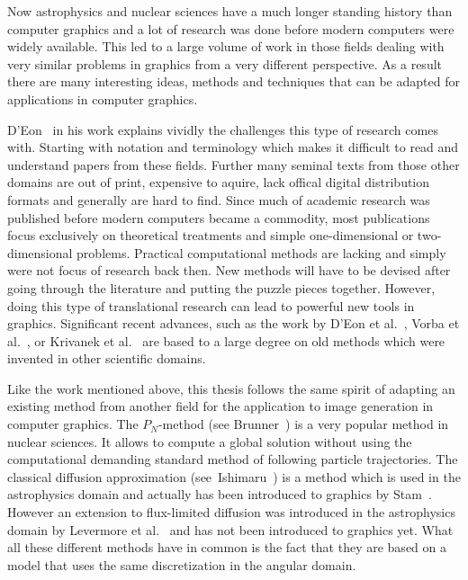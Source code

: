 Now astrophysics and nuclear sciences have a much longer standing history than computer graphics and a lot of research was done before modern computers were widely available. This led to a large volume of work in those fields dealing with very similar problems in graphics from a very different perspective. As a result there are many interesting ideas, methods and techniques that can be adapted for applications in computer graphics.

D'Eon~\cite{DEon14} in his work explains vividly the challenges this type of research comes with. Starting with notation and terminology which makes it difficult to read and understand papers from these fields. Further many seminal texts from those other domains are out of print, expensive to aquire, lack offical digital distribution formats and generally are hard to find. Since much of academic research was published before modern computers became a commodity, most publications focus exclusively on theoretical treatments and simple one-dimensional or two-dimensional problems. Practical computational methods are lacking and simply were not focus of research back then. New methods will have to be devised after going through the literature and putting the puzzle pieces together. However, doing this type of translational research can lead to powerful new tools in graphics. Significant recent advances, such as the work by D'Eon et al.~\cite{dEon11}, Vorba et al.~\cite{Vorba16}, or Krivanek et al.~\cite{Krivanek14} are based to a large degree on old methods which were invented in other scientific domains.

Like the work mentioned above, this thesis follows the same spirit of adapting an existing method from another field for the application to image generation in computer graphics. The $P_N$-method (see Brunner~\cite{Brunner02}) is a very popular method in nuclear sciences. It allows to compute a global solution without using the computational demanding standard method of following particle trajectories. The classical diffusion approximation (see~Ishimaru~\cite{Ishimaru78}) is a method which is used in the astrophysics domain and actually has been introduced to graphics by Stam~\cite{Stam95}. However an extension to flux-limited diffusion was introduced in the astrophysics domain by Levermore et al.~\cite{Levermore81} and has not been introduced to graphics yet. What all these different methods have in common is the fact that they are based on a model that uses the same discretization in the angular domain.

